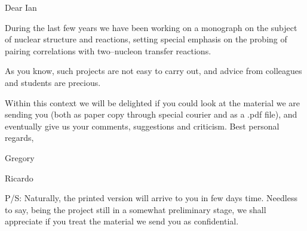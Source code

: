 \documentclass[a4paper,12pt]{book}
\begin{document}
%
Dear Ian


During the last few years we have been working on a monograph on the subject of nuclear structure and reactions, setting special emphasis on the probing of pairing correlations with two--nucleon transfer reactions.

As you know, such projects are not easy to carry out, and advice from colleagues and students are precious.

Within this context we will be delighted if you could look at the material we are sending you (both as paper copy through special courier and as a .pdf file), and eventually give us your comments, suggestions and criticism.
Best personal regards,
\begin{flushleft}
Gregory
	\end{flushleft}
	\vspace{-1.37cm}
\begin{flushright}
 Ricardo
	\end{flushright}
	P/S: Naturally, the printed version will arrive to you in few days time. Needless to say, being the project still in a somewhat preliminary stage, we shall appreciate if you treat the material we send you as confidential.
\end{document}
